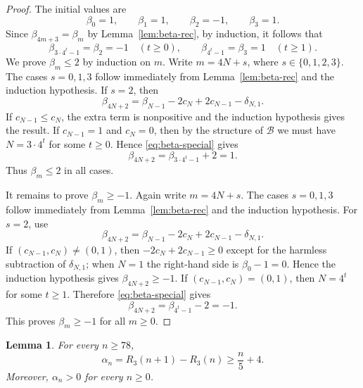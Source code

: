 \documentclass[10pt,a4paper]{amsart}
\newtheorem{lemma}[theorem]{Lemma}
\newcommand{\BaseB}{\mathcal B}
\begin{document}
\begin{proof}
The initial values are
\[
\beta_0=1,\qquad \beta_1=1,\qquad \beta_2=-1,\qquad \beta_3=1.
\]
Since $\beta_{4m+3}=\beta_m$ by Lemma~\ref{lem:beta-rec}, by induction, it follows that
\begin{equation}\label{eq:beta-special}
\beta_{3\cdot 4^t-1}=\beta_2=-1\quad (t\ge 0),\qquad \beta_{4^t-1}=\beta_3=1\quad (t\ge 1).
\end{equation}
We prove $\beta_m\le 2$ by induction on $m$. Write $m=4N+s$, where $s\in\{0,1,2,3\}$. The cases $s=0,1,3$ follow immediately from Lemma~\ref{lem:beta-rec} and the induction hypothesis. If $s=2$, then
\[
\beta_{4N+2}=\beta_{N-1}-2c_N+2c_{N-1}-\delta_{N,1}.
\]
If $c_{N-1}\le c_N$, the extra term is nonpositive and the induction hypothesis gives the result. If $c_{N-1}=1$ and $c_N=0$, then by the structure of $\BaseB$ we must have $N=3\cdot 4^t$ for some $t\ge 0$. Hence \eqref{eq:beta-special} gives
\[
\beta_{4N+2}=\beta_{3\cdot 4^t-1}+2=1.
\]
Thus $\beta_m\le 2$ in all cases.

It remains to prove $\beta_m\ge -1$. Again write $m=4N+s$. The cases $s=0,1,3$ follow immediately from Lemma~\ref{lem:beta-rec} and the induction hypothesis. For $s=2$, use
\[
\beta_{4N+2}=\beta_{N-1}-2c_N+2c_{N-1}-\delta_{N,1}.
\]
If $(c_{N-1},c_N)\ne (0,1)$, then $-2c_N+2c_{N-1}\ge 0$ except for the harmless subtraction of $\delta_{N,1}$; when $N=1$ the right-hand side is $\beta_0-1=0$. Hence the induction hypothesis gives $\beta_{4N+2}\ge -1$. If $(c_{N-1},c_N)=(0,1)$, then $N=4^t$ for some $t\ge 1$. Therefore \eqref{eq:beta-special} gives
\[
\beta_{4N+2}=\beta_{4^t-1}-2=-1.
\]
This proves $\beta_m\ge -1$ for all $m\ge 0$.
\end{proof}

\begin{lemma}\label{lem:alpha-lower}
For every $n\ge 78$,
\[
\alpha_n=R_3(n+1)-R_3(n)\ge \frac n5+4.
\]
Moreover, $\alpha_n>0$ for every $n\ge 0$.
\end{lemma}
\end{document}
